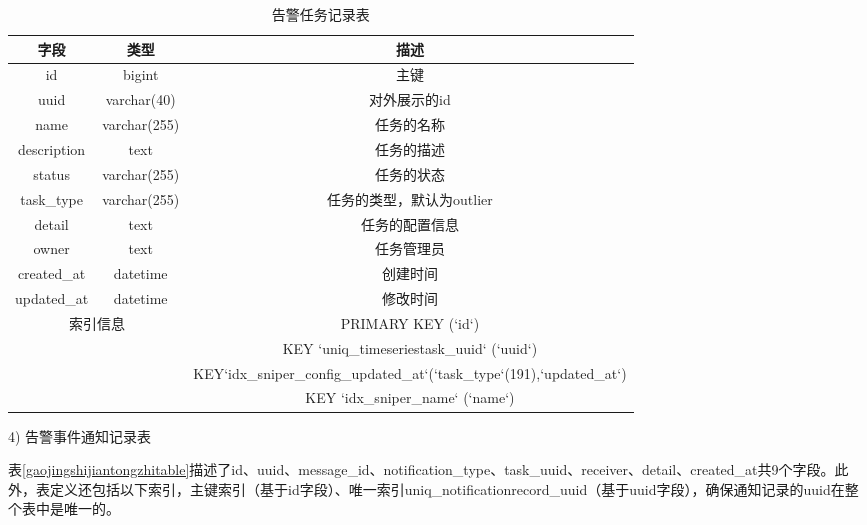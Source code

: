 \begin{longtable}[htbp]
\begin{table}[htbp]  
\centering  
\scriptsize
\caption{告警任务记录表}
\begin{tabular}{|c|c|c|}  
\hline  
字段 & 类型 & 描述 \\ \hline  
id & bigint & 主键 \\ \hline  
uuid & varchar(40) & 对外展示的id \\ \hline  
name & varchar(255) & 任务的名称 \\ \hline  
description & text & 任务的描述 \\ \hline  
status & varchar(255) & 任务的状态 \\ \hline  
task\_type & varchar(255) & 任务的类型，默认为outlier \\ \hline  
detail & text & 任务的配置信息 \\ \hline  
owner & text & 任务管理员 \\ \hline  
created\_at & datetime & 创建时间 \\ \hline  
updated\_at & datetime & 修改时间 \\ \hline  
\multicolumn{2}{|c|}{\multirow{4}{*}{索引信息}} & PRIMARY KEY (`id`) \\ \cline{3-3}  
\multicolumn{2}{|c|}{} & KEY `uniq\_timeseriestask\_uuid` (`uuid`) \\ \cline{3-3}  
\multicolumn{2}{|c|}{} & KEY`idx\_sniper\_config\_updated\_at`(`task\_type`(191),`updated\_at`) \\ \cline{3-3}  
\multicolumn{2}{|c|}{} & KEY `idx\_sniper\_name` (`name`) \\ \hline  
\end{tabular}  
\label{gaojingrecord}
\end{table} 

4)	告警事件通知记录表

表\ref{gaojingshijiantongzhitable}描述了id、uuid、message\_id、notification\_type、task\_uuid、receiver、detail、created\_at共9个字段。此外，表定义还包括以下索引，主键索引（基于id字段）、唯一索引uniq\_notificationrecord\_uuid（基于uuid字段），确保通知记录的uuid在整个表中是唯一的。


\end{longtable}
